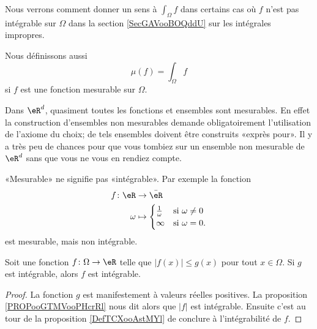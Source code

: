 Nous verrons comment donner un sens à \( \int_{\Omega}f\) dans certains cas où \( f\) n'est pas intégrable sur \( \Omega\) dans la section \ref{SecGAVooBOQddU} sur les intégrales impropres.

Nous définissons aussi
\begin{equation}
    \mu(f)=\int_{\Omega}f
\end{equation}
si \( f\) est une fonction mesurable sur \( \Omega\).

\begin{remark}
    Dans \( \eR^d\), quasiment toutes les fonctions et ensembles sont mesurables. En effet la construction d'ensembles non mesurables demande obligatoirement l'utilisation de l'axiome du choix; de tels ensembles doivent être construits «exprès pour». Il y a très peu de chances pour que vous tombiez sur un ensemble non mesurable de \( \eR^d\) sans que vous ne vous en rendiez compte.
\end{remark}

\begin{remark}
    «Mesurable» ne signifie pas «intégrable». Par exemple la fonction 
    \begin{equation}
        \begin{aligned}
            f\colon \eR&\to \bar\eR \\
            \omega&\mapsto\begin{cases}
            \frac{1}{ \omega }    &   \text{si } \omega\neq 0\\
            \infty    &    \text{si }\omega=0.
            \end{cases}
        \end{aligned}
    \end{equation}
    est mesurable, mais non intégrable.
\end{remark}

\begin{lemma}   \label{LemPfHgal}
    Soit une fonction \( f\colon \Omega\to \eR\) telle que \( | f(x)|\leq g(x) \) pour tout \( x\in\Omega\). Si \( g\) est intégrable, alors \( f\) est intégrable.
\end{lemma}

\begin{proof}
    La fonction \( g\) est manifestement à valeurs réelles positives. La proposition \ref{PROPooGTMVooPHcrRl} nous dit alors que \( | f |\) est intégrable. Ensuite c'est au tour de la proposition \ref{DefTCXooAstMYl} de conclure à l'intégrabilité de \( f\).
\end{proof}

